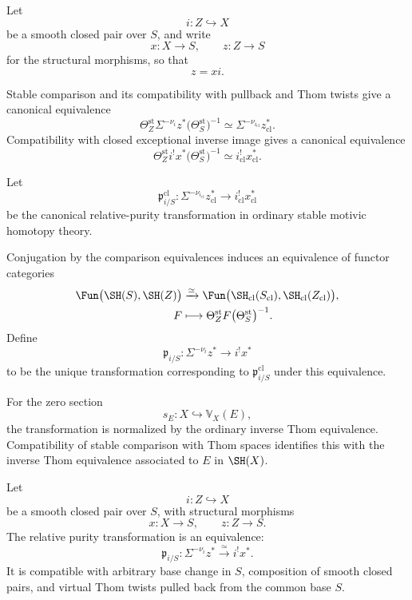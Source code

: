 \begin{construction}
\label{constr:closed-purity-transformation}
Let
\[
    i:Z\hookrightarrow X
\]
be a smooth closed pair over \(S\), and write
\[
    x:X\longrightarrow S,
    \qquad
    z:Z\longrightarrow S
\]
for the structural morphisms, so that
\[
    z=xi.
\]

Stable comparison and its compatibility with pullback and Thom twists give
a canonical equivalence
\[
    \Theta_Z^{\mathrm{st}}
    \Sigma^{-\nu_i}z^*
    \bigl(
      \Theta_S^{\mathrm{st}}
    \bigr)^{-1}
    \simeq
    \Sigma^{-\nu_{i_{\mathrm{cl}}}}
    z_{\mathrm{cl}}^*.
\]
Compatibility with closed exceptional inverse image gives a canonical
equivalence
\[
    \Theta_Z^{\mathrm{st}}
    i^!x^*
    \bigl(
      \Theta_S^{\mathrm{st}}
    \bigr)^{-1}
    \simeq
    i_{\mathrm{cl}}^!x_{\mathrm{cl}}^*.
\]

Let
\[
    \mathfrak p^{\mathrm{cl}}_{i/S}:
    \Sigma^{-\nu_{i_{\mathrm{cl}}}}
    z_{\mathrm{cl}}^*
    \longrightarrow
    i_{\mathrm{cl}}^!x_{\mathrm{cl}}^*
\]
be the canonical relative-purity transformation in ordinary stable motivic
homotopy theory.

Conjugation by the comparison equivalences induces an equivalence of functor
categories
\[
\begin{aligned}
    \Fun
    \bigl(
      \SH(S),
      \SH(Z)
    \bigr)
    &\xrightarrow{\simeq}
    \Fun
    \bigl(
      \SH_{\mathrm{cl}}(S_{\mathrm{cl}}),
      \SH_{\mathrm{cl}}(Z_{\mathrm{cl}})
    \bigr), \\
    F
    &\longmapsto
    \Theta_Z^{\mathrm{st}}
    F
    \bigl(
      \Theta_S^{\mathrm{st}}
    \bigr)^{-1}.
\end{aligned}
\]
Define
\[
    \mathfrak p_{i/S}:
    \Sigma^{-\nu_i}z^*
    \longrightarrow
    i^!x^*
\]
to be the unique transformation corresponding to
\(\mathfrak p^{\mathrm{cl}}_{i/S}\) under this equivalence.

For the zero section
\[
    s_E:X\hookrightarrow\mathbb V_X(E),
\]
the transformation is normalized by the ordinary inverse Thom equivalence.
Compatibility of stable comparison with Thom spaces identifies this with the
inverse Thom equivalence associated to \(E\) in \(\SH(X)\).
\end{construction}

\begin{theorem}
\label{thm:closed-purity-smooth-pair}
Let
\[
    i:Z\hookrightarrow X
\]
be a smooth closed pair over \(S\), with structural morphisms
\[
    x:X\longrightarrow S,
    \qquad
    z:Z\longrightarrow S.
\]
The relative purity transformation is an equivalence:
\[
    \mathfrak p_{i/S}:
    \Sigma^{-\nu_i}z^*
    \xrightarrow{\simeq}
    i^!x^*.
\]
It is compatible with arbitrary base change in \(S\), composition of smooth
closed pairs, and virtual Thom twists pulled back from the common base \(S\).
\end{theorem}

